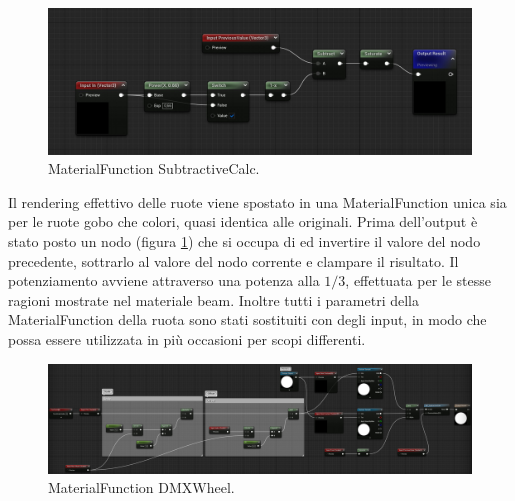 \documentclass[main.tex]{subfiles}
\begin{document}
\clearpage

\begin{figure}
    \centering
    \captionsetup{justification=centering}
    \includegraphics[scale=0.26]{img/renderingPipeline/SubtractiveCalcFull.jpg}
    \caption{MaterialFunction SubtractiveCalc.}
    \label{fig:2_SubtractiveCalc}
\end{figure}
Il rendering effettivo delle ruote viene spostato in una MaterialFunction unica sia per le ruote gobo che colori, quasi identica alle originali. Prima dell'output è stato posto un nodo  (figura \ref{fig:2_SubtractiveCalc}) che si occupa di  ed invertire il valore del nodo precedente, sottrarlo al valore del nodo corrente e clampare il risultato. Il potenziamento avviene attraverso una potenza alla $1/3$, effettuata per le stesse ragioni mostrate nel materiale beam.\newline
Inoltre tutti i parametri della MaterialFunction della ruota sono stati sostituiti con degli input, in modo che possa essere utilizzata in più occasioni per scopi differenti.
\begin{figure}[H]
    \centering
    \includegraphics[width=1\linewidth]{img/renderingPipeline/DMXWheelFuul.jpg}
    \caption{MaterialFunction DMXWheel.}
    \label{fig:2_dmxWheel}
\end{figure}
\end{document}

